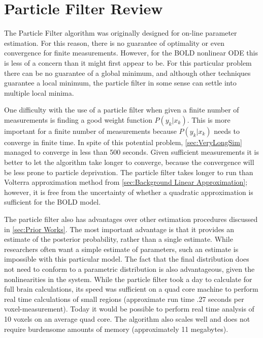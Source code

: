 \section{Particle Filter Review}
The Particle Filter algorithm was originally designed for on-line parameter 
estimation. For this reason, there is no guarantee of optimality or even 
convergence for finite measurements. However, for the BOLD nonlinear ODE 
this is less of a concern than it might first appear to be. For this
particular problem there can be no guarantee of a global minimum, and although
other techniques guarantee a local minimum, the particle filter in some
sense can settle into multiple local minima. 

One difficulty
with the use of a particle filter when given a finite number of measurements is finding
a good weight function $P(y_k | x_k)$. This is more important for a finite
number of measurements because $P(y_k | x_k)$ needs to converge in finite time.
In spite of this potential problem, \autoref{sec:VeryLongSim} managed
to converge in less than 500 seconds.  Given sufficient
measurements it is better to let the algorithm take longer to converge, because the
convergence will be less prone to particle deprivation. The particle filter takes longer
to run than Volterra approximation method from \autoref{sec:Background Linear Approximation};
however, it is free from the uncertainty of whether a quadratic approximation is 
sufficient for the BOLD model. 

The particle filter also has advantages over other estimation procedures
discussed in \autoref{sec:Prior Works}. The most important advantage is that it provides
an estimate of the posterior probability, rather than a single estimate. While researchers
often want a simple estimate of parameters, such an estimate is impossible with this particular
model. The fact that the final distribution does not need to conform to a
parametric distribution is also advantageous, given the nonlinearities in the system.
While the particle filter took a day to calculate for full brain calculations, its speed
was sufficient on a quad core machine to perform real time calculations of small regions
(approximate run time .27 seconds per voxel-measurement). Today it would be possible
 to perform real time analysis of 10 voxels on an average quad core. The algorithm also scales
well and does not require burdensome amounts of memory (approximately 11 megabytes). 

